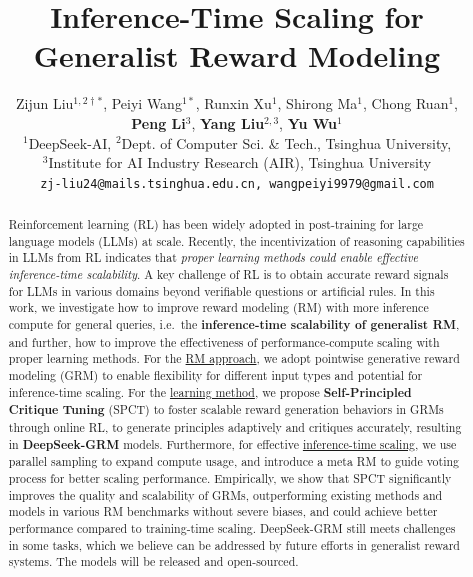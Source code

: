 \documentclass{article} %
\title{Inference-Time Scaling for Generalist Reward Modeling}
\author{Zijun Liu$^{1,2\dag*}$, Peiyi Wang$^{1*}$, Runxin Xu$^{1}$, Shirong Ma$^{1}$, Chong Ruan$^{1}$,\\
\textbf{Peng Li}$^{3}$, \textbf{Yang Liu}$^{2,3}$, \textbf{Yu Wu}$^{1}$ \\
$^{1}$DeepSeek-AI, 
$^{2}$Dept. of Computer Sci. \& Tech., Tsinghua University,\\
$^{3}$Institute for AI Industry Research (AIR), Tsinghua University\\
\texttt{zj-liu24@mails.tsinghua.edu.cn, wangpeiyi9979@gmail.com}
}
\newcommand{\SGRMAll}{DeepSeek-GRM\xspace}
\begin{document}
\ifcolmsubmission
\linenumbers
\fi

\maketitle

\renewcommand{\thefootnote}{\fnsymbol{footnote}}

\begin{abstract}
Reinforcement learning (RL) has been widely adopted in post-training for large language models (LLMs) at scale. 
Recently, the incentivization of reasoning capabilities in LLMs from RL indicates that \emph{proper learning methods could enable effective inference-time scalability}. 
A key challenge of RL is to obtain accurate reward signals for LLMs in various domains beyond verifiable questions or artificial rules.  
In this work, we investigate how to improve reward modeling (RM) with more inference compute for general queries, i.e.~the \textbf{inference-time scalability of generalist RM}, 
and further, how to improve the effectiveness of performance-compute scaling with proper learning methods. 
For the \uline{RM approach}, we adopt pointwise generative reward modeling (GRM) to enable flexibility for different input types and potential for inference-time scaling. 
For the \uline{learning method}, we propose \textbf{Self-Principled Critique Tuning} (SPCT) to foster scalable reward generation behaviors in GRMs through online RL, to generate principles adaptively and critiques accurately, resulting in \textbf{\SGRMAll} models.
Furthermore, for effective \uline{inference-time scaling}, we use parallel sampling to expand compute usage, and introduce a meta RM to guide voting process for better scaling performance. 
Empirically, we show that SPCT significantly improves the quality and scalability of GRMs, outperforming existing methods and models in various RM benchmarks without severe biases, and could achieve better performance compared to training-time scaling. \SGRMAll still meets challenges in some tasks, which we believe can be addressed by future efforts in generalist reward systems.
The models will be released and open-sourced.


\end{abstract}
\end{document}
